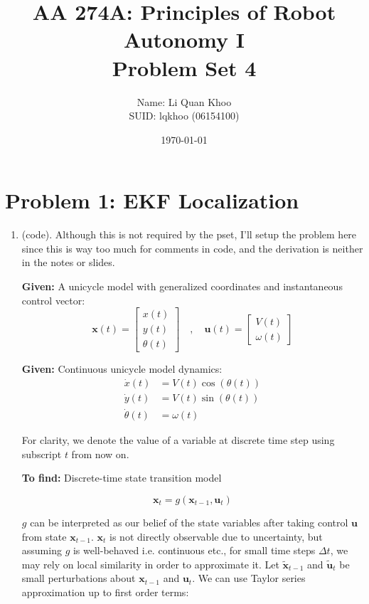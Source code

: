 \documentclass{article}
\title{AA 274A: Principles of Robot Autonomy I \\ Problem Set 4}
\author{Name: Li Quan Khoo     \\ SUID: lqkhoo (06154100)}
\date{\today}
\begin{document}
\maketitle
\pagestyle{fancy} 

\section*{Problem 1: EKF Localization}
\begin{enumerate}[label=(\roman*)]
\item %
(code). Although this is not required by the pset, I'll setup the problem here since this is way too much for comments in code, and the derivation is neither in the notes or slides.

\textbf{Given:} A unicycle model with generalized coordinates and instantaneous control vector:
\begin{equation}
\mathbf{x}(t)=
\begin{bmatrix}
x(t) \\ y(t) \\ \theta(t)
\end{bmatrix}
\quad , \quad
\mathbf{u}(t) =
\begin{bmatrix}
V(t) \\ \omega(t)
\end{bmatrix}
\end{equation}

\textbf{Given:} Continuous unicycle model dynamics:
\begin{equation}
\begin{aligned}
\dot{x}(t) &= V(t) \cos(\theta(t)) \\
\dot{y}(t) &= V(t) \sin(\theta(t)) \\
\dot{\theta}(t) &= \omega(t)
\end{aligned}
\end{equation}

For clarity, we denote the value of a variable at discrete time step using subscript $t$ from now on.

\textbf{To find:} Discrete-time state transition model

\begin{equation}
\mathbf{x}_t = g(\mathbf{x}_{t-1}, \mathbf{u}_t)
\end{equation}

$g$ can be interpreted as our belief of the state variables after taking control $\mathbf{u}$ from state $\mathbf{x}_{t-1}$. $\mathbf{x}_t$ is not directly observable due to uncertainty, but assuming $g$ is well-behaved i.e. continuous etc., for small time steps $\Delta t$, we may rely on local similarity in order to approximate it. Let $\tilde{\mathbf{x}}_{t-1}$ and $\tilde{\mathbf{u}}_t$ be small perturbations about $\mathbf{x}_{t-1}$ and $\mathbf{u}_t$. We can use Taylor series approximation up to first order terms:


\end{enumerate}
\end{document}
